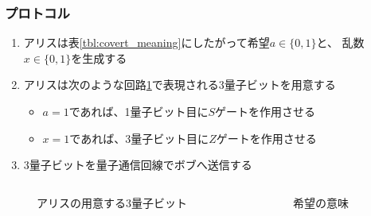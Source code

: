 \begin{frame}
  \frametitle{プロトコル}

  \begin{enumerate}
    \item アリスは表\ref{tbl:covert_meaning}にしたがって希望$a \in \{0, 1\}$と、
    乱数$x \in \{0, 1\}$を生成する

    \item アリスは次のような回路\ref{fig:alice_circuit}で表現される3量子ビットを用意する
    \begin{itemize}
      \item $a = 1$であれば、1量子ビット目に$S$ゲートを作用させる
      \item $x = 1$であれば、3量子ビット目に$Z$ゲートを作用させる
    \end{itemize}

    \item 3量子ビットを量子通信回線でボブへ送信する
  \end{enumerate}

  \begin{columns}
    \begin{column}{0.5\textwidth}
      \begin{figure}
        \centering
        \caption{アリスの用意する3量子ビット}
        \label{fig:alice_circuit}
      \end{figure}
    \end{column}
    \begin{column}{0.5\textwidth}
      \begin{table}[h]
        \caption{希望の意味}
        \label{tbl:covert_meaning}
        \CovertTable
      \end{table}
    \end{column}
  \end{columns}
\end{frame}

